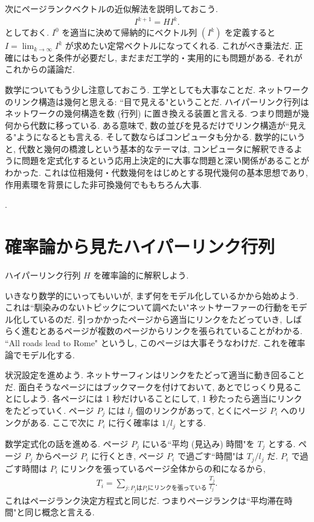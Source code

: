 \documentclass[openany, a4paper, oneside]{jsbook}
\begin{document}
{次にページランクベクトルの近似解法を説明しておこう.
\begin{align}
 I^{k+1}
 =
 H I^k. \label{linear-algebra-google-pagerank9}
\end{align}
としておく.
$I^0$ を適当に決めて帰納的にベクトル列 $(I^k)$ を定義すると
$I=\lim_{k \to \infty} I^k$ が求めたい定常ベクトルになってくれる.
これがべき乗法だ.
正確にはもっと条件が必要だし, まだまだ工学的・実用的にも問題がある.
それがこれからの議論だ.

\begin{rem}
数学についてもう少し注意しておこう.
工学としても大事なことだ.
ネットワークのリンク構造は幾何と思える: ``目で見える"ということだ.
ハイパーリンク行列はネットワークの幾何構造を数 (行列) に置き換える装置と言える.
つまり問題が幾何から代数に移っている.
ある意味で, 数の並びを見るだけでリンク構造が``見える"ようになるとも言える.
そして数ならばコンピュータも分かる.
数学的にいうと, 代数と幾何の橋渡しという基本的なテーマは,
コンピュータに解釈できるように問題を定式化するという応用上決定的に大事な問題と深い関係があることがわかった.
これは位相幾何・代数幾何をはじめとする現代幾何の基本思想であり,
作用素環を背景にした非可換幾何でももちろん大事.
\end{rem}}.
\section{確率論から見たハイパーリンク行列}

ハイパーリンク行列 $H$ を確率論的に解釈しよう.

いきなり数学的にいってもいいが, まず何をモデル化しているかから始めよう.
これは``馴染みのないトピックについて調べたい"ネットサーファーの行動をモデル化しているのだ.
引っかかったページから適当にリンクをたどっていき,
しばらく進むとあるページが複数のページからリンクを張られていることがわかる.
``All roads lead to Rome" というし, このページは大事そうなわけだ.
これを確率論でモデル化する.

状況設定を進めよう.
ネットサーフィンはリンクをたどって適当に動き回ることだ.
面白そうなページにはブックマークを付けておいて, あとでじっくり見ることにしよう.
各ページには 1 秒だけいることにして, 1 秒たったら適当にリンクをたどっていく.
ページ $P_j$ には $l_j$ 個のリンクがあって, とくにページ $P_i$ へのリンクがある.
ここで次に $P_i$ に行く確率は $1/l_j$ とする.

数学定式化の話を進める.
ページ $P_j$ にいる``平均 (見込み) 時間"を $T_j$ とする.
ページ $P_j$ からページ $P_i$ に行くとき, ページ $P_i$ で過ごす``時間"は $T_j/l_j$ だ.
$P_i$ で過ごす時間は $P_i$ にリンクを張っているページ全体からの和になるから,
\begin{align}
 T_i
 =
 \sum_{j:P_j \text{は} P_i \text{にリンクを張っている} } \frac{ T_j }{ l_j }.
\end{align}
これはページランク決定方程式と同じだ.
つまりページランクは``平均滞在時間"と同じ概念と言える.
\end{document}
